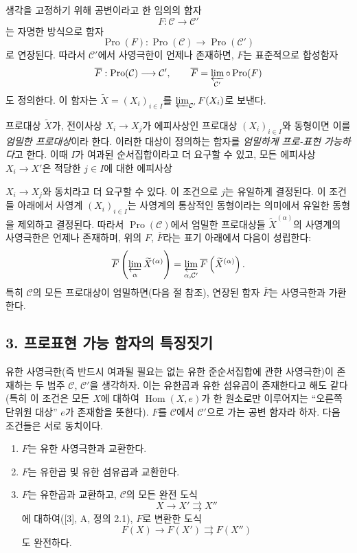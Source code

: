 생각을 고정하기 위해 공변이라고 한 임의의 함자
\[
  F:\mathcal C\longrightarrow\mathcal C'
\]
는 자명한 방식으로 함자
\[
  \operatorname{Pro}(F):\operatorname{Pro}(\mathcal C)
  \longrightarrow\operatorname{Pro}(\mathcal C')
\]
로 연장된다. 따라서 $\mathcal C'$에서 사영극한이 언제나 존재하면,
$F$는 표준적으로 합성함자
\[
  \overline F:\operatorname{Pro}(\mathcal C)\longrightarrow\mathcal C',
  \qquad
  \overline F=\varprojlim_{\mathcal C'}\circ\operatorname{Pro}(F)
\]
도 정의한다. 이 함자는 $\widetilde X=(X_i)_{i\in I}$를
$\varprojlim_{\mathcal C'}F(X_i)$로 보낸다.

프로대상 $\widetilde X$가, 전이사상 $X_i\longrightarrow X_j$가
에피사상인 프로대상 $(X_i)_{i\in I}$와 동형이면 이를
\emph{엄밀한 프로대상}이라 한다. 이러한 대상이 정의하는 함자를
\emph{엄밀하게 프로-표현 가능하다}고 한다. 이때 $I$가 여과된
순서집합이라고 더 요구할 수 있고, 모든 에피사상
$X_i\longrightarrow X'$은 적당한 $j\in I$에 대한 에피사상

$X_i\longrightarrow X_j$와 동치라고 더 요구할 수 있다. 이 조건으로
$j$는 유일하게 결정된다. 이 조건들 아래에서 사영계
$(X_i)_{i\in I}$는 사영계의 통상적인 동형이라는 의미에서 유일한 동형을
제외하고 결정된다. 따라서 $\operatorname{Pro}(\mathcal C)$에서 엄밀한
프로대상들 $\widetilde X^{(\alpha)}$의 사영계의 사영극한은 언제나
존재하며, 위의 $F$, $\overline F$라는 표기 아래에서 다음이 성립한다:
\[
  \overline F\left(\varprojlim_\alpha\widetilde X^{(\alpha)}\right)
  =\varprojlim_{\alpha,\mathcal C'}
  \overline F\left(\widetilde X^{(\alpha)}\right).
\]
특히 $\mathcal C$의 모든 프로대상이 엄밀하면(다음 절 참조), 연장된 함자
$\overline F$는 사영극한과 가환한다.
\subsection*{3. 프로표현 가능 함자의 특징짓기}

유한 사영극한(즉 반드시 여과될 필요는 없는 유한 준순서집합에 관한
사영극한)이 존재하는 두 범주 $\mathcal C$, $\mathcal C'$을 생각하자. 이는
유한곱과 유한 섬유곱이 존재한다고 해도 같다(특히 이 조건은 모든 $X$에
대하여 $\operatorname{Hom}(X,e)$가 한 원소로만 이루어지는 ``오른쪽 단위원
대상'' $e$가 존재함을 뜻한다). $F$를 $\mathcal C$에서 $\mathcal C'$으로 가는
공변 함자라 하자. 다음 조건들은 서로 동치이다.

\begin{enumerate}
\item[(i)] $F$는 유한 사영극한과 교환한다.
\item[(ii)] $F$는 유한곱 및 유한 섬유곱과 교환한다.
\item[(iii)] $F$는 유한곱과 교환하고, $\mathcal C$의 모든 완전 도식
\[
  X\longrightarrow X'\rightrightarrows X''
\]
에 대하여([3], A, 정의 2.1), $F$로 변환한 도식
\[
  F(X)\longrightarrow F(X')\rightrightarrows F(X'')
\]
도 완전하다.
\end{enumerate}

